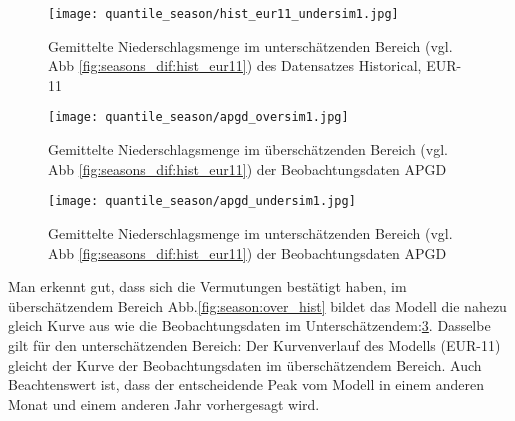 \begin{figure}
	\texttt{[image: quantile\_season/hist\_eur11\_undersim1.jpg]}
	\caption{Gemittelte Niederschlagsmenge im unterschätzenden Bereich (vgl. Abb \ref{fig:seasons_dif:hist_eur11}) des Datensatzes Historical, EUR-11}
	\label{fig:season:under_hist}
\end{figure}
\begin{figure}
		\texttt{[image: quantile\_season/apgd\_oversim1.jpg]}
		\caption{Gemittelte Niederschlagsmenge im überschätzenden Bereich (vgl. Abb \ref{fig:seasons_dif:hist_eur11}) der Beobachtungsdaten APGD}
		\label{fig:season:over_apgd}
\end{figure}
\begin{figure}
		\texttt{[image: quantile\_season/apgd\_undersim1.jpg]}
		\caption{Gemittelte Niederschlagsmenge im unterschätzenden Bereich (vgl. Abb \ref{fig:seasons_dif:hist_eur11}) der Beobachtungsdaten APGD}
	\label{fig:season:under_apgd}
\end{figure}\newpage
Man erkennt gut, dass sich die Vermutungen bestätigt haben, im überschätzendem Bereich Abb.\ref{fig:season:over_hist} bildet das Modell die nahezu gleich Kurve aus wie die Beobachtungsdaten im Unterschätzendem:\ref{fig:season:under_apgd}. Dasselbe gilt für den unterschätzenden Bereich: Der Kurvenverlauf des Modells (EUR-11) gleicht der Kurve der Beobachtungsdaten im überschätzendem Bereich. Auch Beachtenswert ist, dass der entscheidende Peak vom Modell in einem anderen Monat und einem anderen Jahr vorhergesagt wird.\\

